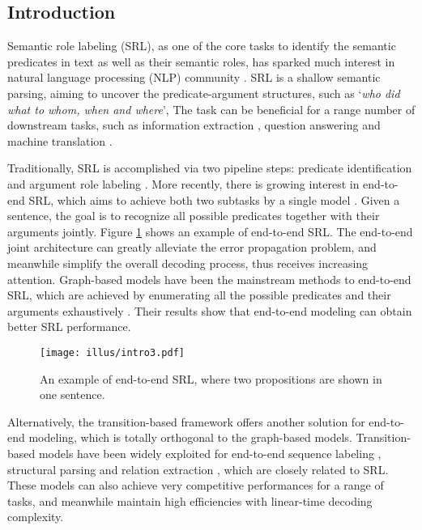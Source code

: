 \documentclass[letterpaper]{article} \usepackage{aaai21}  \usepackage{times}  \usepackage{helvet} \usepackage{courier}  \usepackage[hyphens]{url}  \usepackage{graphicx} \urlstyle{rm} \def\UrlFont{\rm}  \usepackage{natbib}  \usepackage{caption}
\begin{document}
\begin{CJK}{UTF8}{gbsn}
\section{Introduction}

Semantic role labeling (SRL), as one of the core tasks to identify the semantic predicates in text as well as their semantic roles,
has sparked much interest in natural language processing (NLP) community \cite{pradhan-etal-2005-semantic,lei-etal-2015-high,XiaL0ZFWS19}.
SRL is a shallow semantic parsing, aiming to uncover the predicate-argument structures, such as `\emph{who did what to whom, when and where}',
The task can be beneficial for a range number of downstream tasks, such as information extraction \cite{ChristensenMSE11,bastianelli-etal-2013-textual}, question answering \cite{shen-lapata-2007-using,berant-etal-2013-semantic} and machine translation \cite{xiong-etal-2012-modeling,shi-etal-2016-knowledge}.



Traditionally, SRL is accomplished via two pipeline steps: predicate identification \cite{SCHEIBLE10} and argument role labeling \cite{pradhan-etal-2005-semantic}.
More recently, there is growing interest in end-to-end SRL,
which aims to achieve both two subtasks by a single model \cite{he-etal-2018-jointly}.
Given a sentence, the goal is to recognize all possible predicates
together with their arguments jointly.
Figure \ref{intro} shows an example of end-to-end SRL.
The end-to-end joint architecture can greatly alleviate the error propagation problem,
and meanwhile simplify the overall decoding process,
thus receives increasing attention.
Graph-based models have been the mainstream methods to end-to-end SRL,
which are achieved by enumerating all the possible predicates and their arguments  exhaustively \cite{he-etal-2018-jointly,cai-etal-2018-full,LiHZZZZZ19}.
Their results show that end-to-end modeling can obtain better SRL performance.








\begin{figure}[!t]
\centering \texttt{[image: illus/intro3.pdf]}
\caption{
An example of end-to-end SRL, where two propositions are shown in one sentence.
}
\label{intro}
\end{figure}





Alternatively, the transition-based framework offers another solution for end-to-end modeling,
which is totally orthogonal to the graph-based models.
Transition-based models have been widely exploited for end-to-end sequence labeling \cite{zhang-clark-2010-fast,LyuZJ16,ZhangZF18},
structural parsing \cite{zhou-etal-2015-neural,dyer-etal-2015-transition,YuanJT19} and relation extraction \cite{wang-etal-2018-neural-transition,ZhangQZLJ19},
which are closely related to SRL.
These models can also achieve very competitive performances for a range of tasks,
and meanwhile maintain high efficiencies with linear-time decoding complexity.






\end{CJK}
\end{document}
